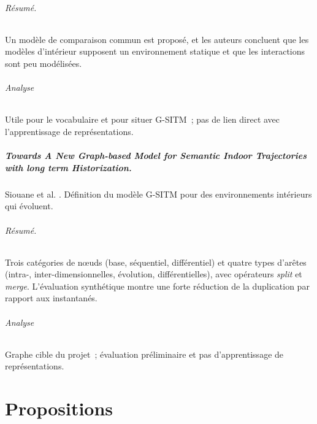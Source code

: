 \documentclass[11pt, french, screen, research-development]{report-rd-info}
\begin{document}
\subparagraph{Résumé.}
 Un modèle de comparaison commun est proposé, et les auteurs concluent que les modèles d'intérieur
supposent un environnement statique et que les interactions sont peu modélisées.

\subparagraph{Analyse}
 Utile pour le vocabulaire et pour situer G-SITM~; pas de lien direct avec l'apprentissage de
représentations.

\paragraph{\emph{Towards A New Graph-based Model for Semantic Indoor Trajectories with long term Historization}.}
Siouane et al. \cite{siouane2026gsitm}.
Définition du modèle G-SITM pour des environnements intérieurs qui évoluent.

\subparagraph{Résumé.}
 Trois catégories de nœuds (base, séquentiel, différentiel) et quatre types d'arêtes (intra-,
inter-dimensionnelles, évolution, différentielles), avec opérateurs \emph{split} et \emph{merge}.
L'évaluation synthétique montre une forte réduction de la duplication par rapport aux instantanés.

\subparagraph{Analyse}
Graphe cible du projet~; évaluation préliminaire et pas d'apprentissage de représentations.



\chapter{Propositions}
\label{chap:Propositions}
\end{document}
